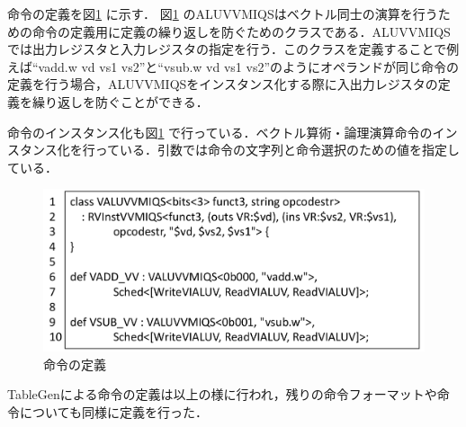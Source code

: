 命令の定義を図\ref{fig:Inst_def}
に示す．
図\ref{fig:Inst_def}
のALUVVMIQSはベクトル同士の演算を行うための命令の定義用に定義の繰り返しを防ぐためのクラスである．ALUVVMIQSでは出力レジスタと入力レジスタの指定を行う．このクラスを定義することで例えば``vadd.w vd vs1 vs2''と``vsub.w vd vs1 vs2''のようにオペランドが同じ命令の定義を行う場合，ALUVVMIQSをインスタンス化する際に入出力レジスタの定義を繰り返しを防ぐことができる．

命令のインスタンス化も図\ref{fig:Inst_def}
で行っている．ベクトル算術・論理演算命令のインスタンス化を行っている．引数では命令の文字列と命令選択のための値を指定している．

\begin{figure}[tb]
    \centering
    \includegraphics[scale=0.6]{image/Instruction_define.pdf}
    \caption{命令の定義}
    \label{fig:Inst_def}
\end{figure}

TableGenによる命令の定義は以上の様に行われ，残りの命令フォーマットや命令についても同様に定義を行った．
